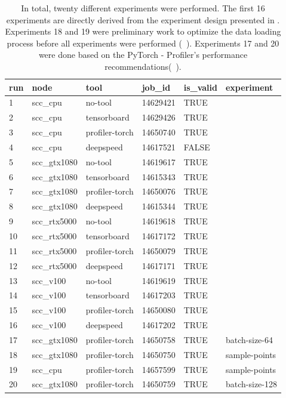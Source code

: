 \documentclass[12pt, a4paper, hidelinks]{article}
\begin{document}
\begin{table}[H]
\centering
\begin{tabular}{@{}llllll@{}}
\toprule
run & node         & tool           & job\_id  & is\_valid & experiment     \\ \midrule
1   & scc\_cpu     & no-tool        & 14629421 & TRUE      &                \\
2   & scc\_cpu     & tensorboard    & 14629426 & TRUE      &                \\
3   & scc\_cpu     & profiler-torch & 14650740 & TRUE      &                \\
4   & scc\_cpu     & deepspeed      & 14617521 & FALSE     &                \\
5   & scc\_gtx1080 & no-tool        & 14619617 & TRUE      &                \\
6   & scc\_gtx1080 & tensorboard    & 14615343 & TRUE      &                \\
7   & scc\_gtx1080 & profiler-torch & 14650076 & TRUE      &                \\
8   & scc\_gtx1080 & deepspeed      & 14615344 & TRUE      &                \\
9   & scc\_rtx5000 & no-tool        & 14619618 & TRUE      &                \\
10  & scc\_rtx5000 & tensorboard    & 14617172 & TRUE      &                \\
11  & scc\_rtx5000 & profiler-torch & 14650079 & TRUE      &                \\
12  & scc\_rtx5000 & deepspeed      & 14617171 & TRUE      &                \\
13  & scc\_v100    & no-tool        & 14619619 & TRUE      &                \\
14  & scc\_v100    & tensorboard    & 14617203 & TRUE      &                \\
15  & scc\_v100    & profiler-torch & 14650080 & TRUE      &                \\
16  & scc\_v100    & deepspeed      & 14617202 & TRUE      &                \\
17  & scc\_gtx1080 & profiler-torch & 14650758 & TRUE      & batch-size-64  \\
18  & scc\_gtx1080 & profiler-torch & 14650750 & TRUE      & sample-points  \\
19  & scc\_cpu     & profiler-torch & 14657599 & TRUE      & sample-points  \\
20  & scc\_gtx1080 & profiler-torch & 14650759 & TRUE      & batch-size-128 \\ \bottomrule
\end{tabular}
\caption[Overview of all runs]{In total, twenty different experiments were performed. The first 16 experiments are directly derived from the experiment design presented in . Experiments 18 and 19 were preliminary work to optimize the data loading process before all experiments were performed (~). Experiments 17 and 20 were done based on the PyTorch - Profiler's performance recommendations(~).}
\label{tab:experiments-all}
\end{table}
\end{document}
